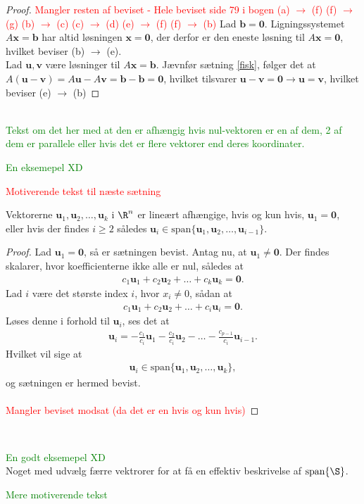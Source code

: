 %
\begin{proof}
%
\textcolor{red}{Mangler resten af beviset - Hele beviset side 79 i bogen
%
(a) $\rightarrow$ (f)
(f) $\rightarrow$ (g)
(b) $\rightarrow$ (c)
(c) $\rightarrow$ (d)
(e) $\rightarrow$ (f)
(f) $\rightarrow$ (b)
%
}
Lad $\mathbf{b}=\mathbf{0}$. 
Ligningssystemet $A\mathbf{x}=\mathbf{b}$ har altid løsningen $\mathbf{x}=\mathbf{0}$, der derfor er den eneste løsning til $A\mathbf{x}=\mathbf{0}$, hvilket beviser (b) $\rightarrow$ (e).
\\
Lad $\mathbf{u}, \mathbf{v}$ være løsninger til $A\mathbf{x}=\mathbf{b}$.
Jævnfør sætning \ref{fisk}, følger det at $A(\mathbf{u}-\mathbf{v})=A\mathbf{u}-A\mathbf{v}=\mathbf{b}-\mathbf{b}=\mathbf{0}$, hvilket tilsvarer $\mathbf{u}-\mathbf{v}=\mathbf{0}
\rightarrow  
\mathbf{u} =\mathbf{v}$, hvilket beviser (e) $\rightarrow$ (b)
%
%
\end{proof}
\\
%
\textcolor{green}{Tekst om det her med at den er afhængig hvis nul-vektoren er en af dem, 2 af dem er parallele eller hvis det er flere vektorer end deres koordinater.}
\\
%
\begin{eks}
\textcolor{green}{En eksemepel XD}
\end{eks}
%
\textcolor{red}{Motiverende tekst til næste sætning}
%
\begin{thm}{}{}
%
Vektorerne $\mathbf{u}_1,\mathbf{u}_2, \ldots ,\mathbf{u}_k$ i $\R^n$ er lineært afhængige, 
hvis og kun hvis, $\mathbf{u}_1=\mathbf{0}$, eller hvis der findes $i \geq 2$ således $\mathbf{u}_i \in \text{span} \{ \mathbf{u}_1,\mathbf{u}_2, \ldots ,\mathbf{u}_{i-1} \}$.
%
\end{thm}
%
\begin{proof}
%
Lad $\mathbf{u}_1=\mathbf{0}$, så er sætningen bevist. 
Antag nu, at $\mathbf{u}_1 \neq \mathbf{0}$. 
Der findes skalarer, hvor koefficienterne ikke alle er nul, således at
% 
\begin{align*}
c_1 \mathbf{u}_1 + c_2 \mathbf{u}_2 + \ldots + c_k \mathbf{u}_k = \mathbf{0}.
\end{align*}
%
Lad $i$ være det største index $i$, hvor $x_i \neq 0$, sådan at 
\begin{align*}
c_1 \mathbf{u}_1 + c_2 \mathbf{u}_2 + \ldots + c_i \mathbf{u}_i = \mathbf{0}.
\end{align*}
Løses denne i forhold til $\mathbf{u}_i$, ses det at
\begin{align*}
\mathbf{u}_i = - \frac{c_1}{c_i} \mathbf{u}_1 - \frac{c_2}{c_i} \mathbf{u}_2 - \ldots - \frac{c_{p-1}}{c_i} \mathbf{u}_{i-1}.
\end{align*}
Hvilket vil sige at 
\begin{align*}
\mathbf{u}_i \in \text{span}\{ \mathbf{u}_1,\mathbf{u}_2, \ldots ,\mathbf{u}_k \},
\end{align*}
%
og sætningen er hermed bevist.
%
\\\\
\textcolor{red}{Mangler beviset modsat (da det er en hvis og kun hvis)}
%
\end{proof}
\\
%
%
\begin{eks}
\textcolor{green}{En godt eksemepel XD} 
\\
Noget med udvælg færre vektrorer for at få en effektiv beskrivelse af $\text{span}\{\S\}$.
\end{eks}
%
\textcolor{green}{Mere motiverende tekst}